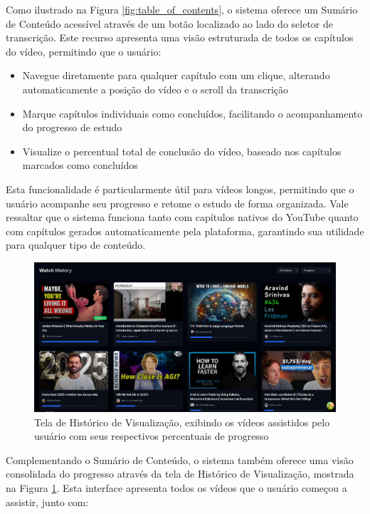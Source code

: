 \documentclass[tcc,capa]{texufpel}
\begin{document}
Como ilustrado na Figura \ref{fig:table_of_contents}, o sistema oferece um Sumário de Conteúdo acessível através de um botão localizado ao lado do seletor de transcrição. Este recurso apresenta uma visão estruturada de todos os capítulos do vídeo, permitindo que o usuário:

\begin{itemize}
    \item Navegue diretamente para qualquer capítulo com um clique, alterando automaticamente a posição do vídeo e o scroll da transcrição
    \item Marque capítulos individuais como concluídos, facilitando o acompanhamento do progresso de estudo
    \item Visualize o percentual total de conclusão do vídeo, baseado nos capítulos marcados como concluídos
\end{itemize}

Esta funcionalidade é particularmente útil para vídeos longos, permitindo que o usuário acompanhe seu progresso e retome o estudo de forma organizada. Vale ressaltar que o sistema funciona tanto com capítulos nativos do YouTube quanto com capítulos gerados automaticamente pela plataforma, garantindo sua utilidade para qualquer tipo de conteúdo.

\begin{figure}[H]
  \centering
  \includegraphics[width=\textwidth,height=0.45\textheight,keepaspectratio]{exemplo-slides/graphics/images/watch history.png}
  \caption{Tela de Histórico de Visualização, exibindo os vídeos assistidos pelo usuário com seus respectivos percentuais de progresso}
  \label{fig:watch_history}
\end{figure}

Complementando o Sumário de Conteúdo, o sistema também oferece uma visão consolidada do progresso através da tela de Histórico de Visualização, mostrada na Figura \ref{fig:watch_history}. Esta interface apresenta todos os vídeos que o usuário começou a assistir, junto com:
\end{document}
